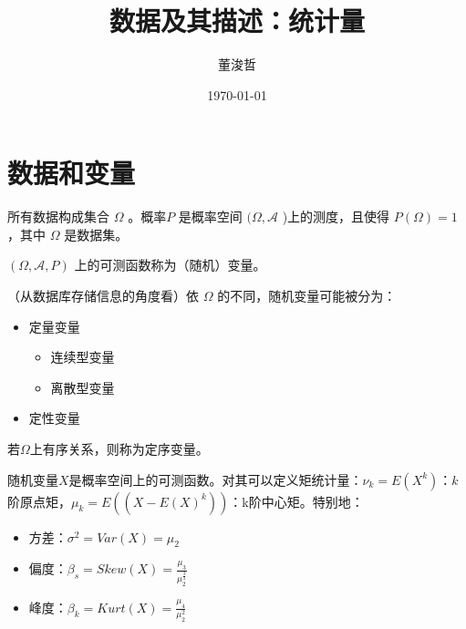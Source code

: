 \documentclass[UTF-8]{ctexbeamer}
\title{数据及其描述：统计量}
\author{董浚哲}
\date{\today}
\begin{document}
\newcommand{\wrt}{w.r.t.}
\newcommand{\dd}{\,\mathrm{d}}
\newcommand{\st}{\text{ s.t. }}
\newcommand{\pp}[2]{\frac{\partial #1}{\partial #2}}
\newcommand{\dif}[2]{\frac{\mathrm{d} #1}{\mathrm{d} #2}}


\newtheorem{Thm}{定理}[section]
\newtheorem{Prop}[Thm]{命题}
\newtheorem{Cor}[Thm]{推论}
\newtheorem{Def}{定义}[section]
\newtheorem{Rmk}{注}[section]
\newtheorem{Eg}{例}[section]

\begin{frame}
\titlepage
\end{frame}

\section{数据和变量}
\begin{frame}
所有数据构成集合 $\Omega$ 。概率$P$ 是概率空间 $(\Omega,\mathscr{A}$ )上的测度，且使得 $P(\Omega)=1$ ，其中 $\Omega$ 是数据集。

$ (\Omega,\mathscr{A},P) $ 上的可测函数称为（随机）变量。

（从数据库存储信息的角度看）依 $\Omega$ 的不同，随机变量可能被分为：
\begin{itemize}
\item 定量变量
  \begin{itemize}
  \item 连续型变量
  \item 离散型变量
  \end{itemize}
\item 定性变量
\end{itemize}
若$\Omega$上有序关系，则称为定序变量。
\end{frame}

\begin{frame}
  随机变量$X$是概率空间上的可测函数。对其可以定义矩统计量：$\nu_{k}=E(X^{k})$：$k$阶原点矩，$\mu_{k}=E((X-E(X)^{k}))$：k阶中心矩。特别地：
  \begin{itemize}
    
  \item 方差：$\sigma^{2}=Var(X)=\mu_{2}$
  \item 偏度：$\beta_{s}=Skew(X)=\frac{\mu_{3}}{\mu_{2}^{\frac 3 2}}$
  \item 峰度：$\beta_{k}=Kurt(X)=\frac{\mu_{4}}{\mu_{2}^{2}}$
  \end{itemize}
\end{frame}
\end{document}
